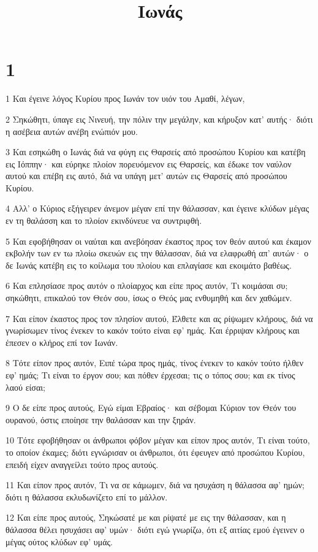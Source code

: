 

\title{Ιωνάς}


\chapter{1}

\par 1 Και έγεινε λόγος Κυρίου προς Ιωνάν τον υιόν του Αμαθί, λέγων,
\par 2 Σηκώθητι, ύπαγε εις Νινευή, την πόλιν την μεγάλην, και κήρυξον κατ' αυτής· διότι η ασέβεια αυτών ανέβη ενώπιόν μου.
\par 3 Και εσηκώθη ο Ιωνάς διά να φύγη εις Θαρσείς από προσώπου Κυρίου και κατέβη εις Ιόππην· και εύρηκε πλοίον πορευόμενον εις Θαρσείς, και έδωκε τον ναύλον αυτού και επέβη εις αυτό, διά να υπάγη μετ' αυτών εις Θαρσείς από προσώπου Κυρίου.
\par 4 Αλλ' ο Κύριος εξήγειρεν άνεμον μέγαν επί την θάλασσαν, και έγεινε κλύδων μέγας εν τη θαλάσση και το πλοίον εκινδύνευε να συντριφθή.
\par 5 Και εφοβήθησαν οι ναύται και ανεβόησαν έκαστος προς τον θεόν αυτού και έκαμον εκβολήν των εν τω πλοίω σκευών εις την θάλασσαν, διά να ελαφρωθή απ' αυτών· ο δε Ιωνάς κατέβη εις το κοίλωμα του πλοίου και επλαγίασε και εκοιμάτο βαθέως.
\par 6 Και επλησίασε προς αυτόν ο πλοίαρχος και είπε προς αυτόν, Τι κοιμάσαι συ; σηκώθητι, επικαλού τον Θεόν σου, ίσως ο Θεός μας ενθυμηθή και δεν χαθώμεν.
\par 7 Και είπον έκαστος προς τον πλησίον αυτού, Έλθετε και ας ρίψωμεν κλήρους, διά να γνωρίσωμεν τίνος ένεκεν το κακόν τούτο είναι εφ' ημάς. Και έρριψαν κλήρους και έπεσεν ο κλήρος επί τον Ιωνάν.
\par 8 Τότε είπον προς αυτόν, Ειπέ τώρα προς ημάς, τίνος ένεκεν το κακόν τούτο ήλθεν εφ' ημάς; Τι είναι το έργον σου; και πόθεν έρχεσαι; τις ο τόπος σου; και εκ τίνος λαού είσαι;
\par 9 Ο δε είπε προς αυτούς, Εγώ είμαι Εβραίος· και σέβομαι Κύριον τον Θεόν του ουρανού, όστις εποίησε την θαλάσσαν και την ξηράν.
\par 10 Τότε εφοβήθησαν οι άνθρωποι φόβον μέγαν και είπον προς αυτόν, Τι είναι τούτο, το οποίον έκαμες; διότι εγνώρισαν οι άνθρωποι, ότι έφευγεν από προσώπου Κυρίου, επειδή είχεν αναγγείλει τούτο προς αυτούς.
\par 11 Και είπον προς αυτόν, Τι να σε κάμωμεν, διά να ησυχάση η θάλασσα αφ' ημών; διότι η θάλασσα εκλυδωνίζετο επί το μάλλον.
\par 12 Και είπε προς αυτούς, Σηκώσατέ με και ρίψατέ με εις την θάλασσαν, και η θάλασσα θέλει ησυχάσει αφ' υμών· διότι εγώ γνωρίζω, ότι εξ αιτίας εμού έγεινεν ο μέγας ούτος κλύδων εφ' υμάς.
